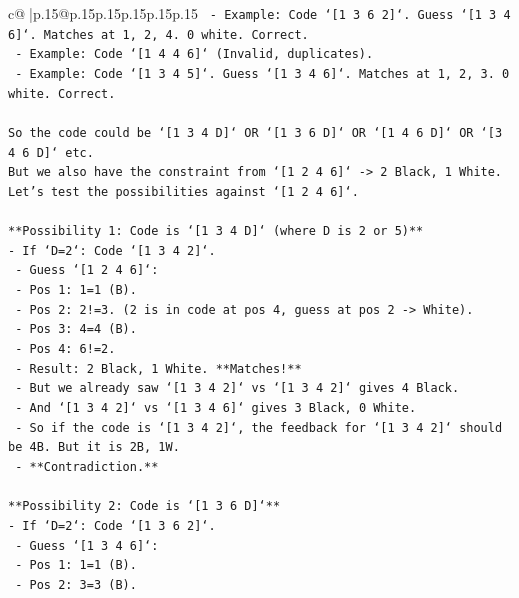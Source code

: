 \documentclass{article}
\begin{document}
{\begin{supertabular}{c@{$\;$}|p{.15\linewidth}@{}p{.15\linewidth}p{.15\linewidth}p{.15\linewidth}p{.15\linewidth}p{.15\linewidth}}
{{{\texttt{    {-} Example: Code `{[}1 3 6 2{]}`. Guess `{[}1 3 4 6{]}`. Matches at 1, 2, 4. 0 white. Correct.} \\
\texttt{    {-} Example: Code `{[}1 4 4 6{]}` (Invalid, duplicates).} \\
\texttt{    {-} Example: Code `{[}1 3 4 5{]}`. Guess `{[}1 3 4 6{]}`. Matches at 1, 2, 3. 0 white. Correct.} \\
\\ 
\texttt{So the code could be `{[}1 3 4 D{]}` OR `{[}1 3 6 D{]}` OR `{[}1 4 6 D{]}` OR `{[}3 4 6 D{]}` etc.} \\
\texttt{But we also have the constraint from `{[}1 2 4 6{]}` {-}> 2 Black, 1 White.} \\
\texttt{Let's test the possibilities against `{[}1 2 4 6{]}`.} \\
\\ 
\texttt{**Possibility 1: Code is `{[}1 3 4 D{]}` (where D is 2 or 5)**} \\
\texttt{{-} If `D=2`: Code `{[}1 3 4 2{]}`.} \\
\texttt{    {-} Guess `{[}1 2 4 6{]}`:} \\
\texttt{        {-} Pos 1: 1=1 (B).} \\
\texttt{        {-} Pos 2: 2!=3. (2 is in code at pos 4, guess at pos 2 {-}> White).} \\
\texttt{        {-} Pos 3: 4=4 (B).} \\
\texttt{        {-} Pos 4: 6!=2.} \\
\texttt{        {-} Result: 2 Black, 1 White. **Matches!**} \\
\texttt{    {-} But we already saw `{[}1 3 4 2{]}` vs `{[}1 3 4 2{]}` gives 4 Black.} \\
\texttt{    {-} And `{[}1 3 4 2{]}` vs `{[}1 3 4 6{]}` gives 3 Black, 0 White.} \\
\texttt{    {-} So if the code is `{[}1 3 4 2{]}`, the feedback for `{[}1 3 4 2{]}` should be 4B. But it is 2B, 1W.} \\
\texttt{    {-} **Contradiction.**} \\
\\ 
\texttt{**Possibility 2: Code is `{[}1 3 6 D{]}`**} \\
\texttt{{-} If `D=2`: Code `{[}1 3 6 2{]}`.} \\
\texttt{    {-} Guess `{[}1 3 4 6{]}`:} \\
\texttt{        {-} Pos 1: 1=1 (B).} \\
\texttt{        {-} Pos 2: 3=3 (B).} \\
}}}
\end{supertabular}}
\end{document}
